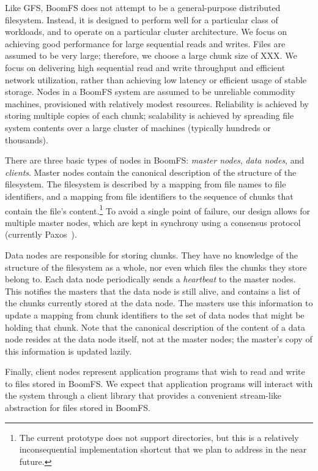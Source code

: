 \documentclass{article}
\begin{document}
Like GFS, BoomFS does not attempt to be a general-purpose distributed
filesystem. Instead, it is designed to perform well for a particular
class of workloads, and to operate on a particular cluster
architecture. We focus on achieving good performance for large
sequential reads and writes. Files are assumed to be very large;
therefore, we choose a large chunk size of XXX. We focus on delivering
high sequential read and write throughput and efficient network
utilization, rather than achieving low latency or efficient usage of
stable storage. Nodes in a BoomFS system are assumed to be unreliable
commodity machines, provisioned with relatively modest resources.
Reliability is achieved by storing multiple copies of each chunk;
scalability is achieved by spreading file system contents over a large
cluster of machines (typically hundreds or thousands).

There are three basic types of nodes in BoomFS: \emph{master nodes},
\emph{data nodes}, and \emph{clients}. Master nodes contain the
canonical description of the structure of the filesystem. The
filesystem is described by a mapping from file names to file
identifiers, and a mapping from file identifiers to the sequence of
chunks that contain the file's content.\footnote{The current prototype
  does not support directories, but this is a relatively
  inconsequential implementation shortcut that we plan to address in
  the near future.} To avoid a single point of failure, our design
allows for multiple master nodes, which are kept in synchrony using a
consensus protocol (currently Paxos~\cite{paxos-made-simple}).

Data nodes are responsible for storing chunks. They have no knowledge
of the structure of the filesystem as a whole, nor even which files
the chunks they store belong to. Each data node periodically sends a
\emph{heartbeat} to the master nodes. This notifies the masters that
the data node is still alive, and contains a list of the chunks
currently stored at the data node. The masters use this information to
update a mapping from chunk identifiers to the set of data nodes that
might be holding that chunk. Note that the canonical description of
the content of a data node resides at the data node itself, not at the
master nodes; the master's copy of this information is updated lazily.

Finally, client nodes represent application programs that wish to read
and write to files stored in BoomFS. We expect that application
programs will interact with the system through a client library that
provides a convenient stream-like abstraction for files stored in
BoomFS. %
\end{document}
